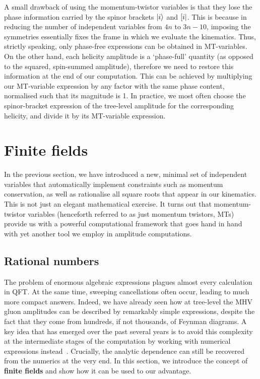 \documentclass[main.tex]{subfiles}
\begin{document}
A small drawback of using the momentum-twistor variables is that they lose the phase information carried by the spinor brackets $|i \rangle$ and $\left[ i \right|$. This is because in reducing the number of independent variables from $4n$ to $3n-10$, imposing the symmetries essentially fixes the frame in which we evaluate the kinematics. Thus, strictly speaking, only phase-free expressions can be obtained in MT-variables. On the other hand, each helicity amplitude is a `phase-full' quantity (as opposed to the squared, spin-summed amplitude), therefore we need to restore this information at the end of our computation. This can be achieved by multiplying our MT-variable expression by any factor with the same phase content, normalised such that its magnitude is 1. In practice, we most often choose the spinor-bracket expression of the tree-level amplitude for the corresponding helicity, and divide it by its MT-variable expression.
\section{Finite fields} \label{sec:FF}
In the previous section, we have introduced a new, minimal set of independent variables that automatically implement constraints such as momentum conservation, as well as rationalise all square roots that appear in our kinematics. This is not just an elegant mathematical exercise. It turns out that momentum-twistor variables (henceforth referred to as just momentum twistors, MTs) provide us with a powerful computational framework that goes hand in hand with yet another tool we employ in amplitude computations.
\subsection{Rational numbers} \label{sec:ratnums}
The problem of enormous algebraic expressions plagues almost every calculation in QFT. At the same time, sweeping cancellations often occur, leading to much more compact answers. Indeed, we have already seen how at tree-level the MHV gluon amplitudes can be described by remarkably simple expressions, despite the fact that they come from hundreds, if not thousands, of Feynman diagrams. A key idea that has emerged over the past several years is to avoid this complexity at the intermediate stages of the computation by working with numerical expressions instead~\cite{Peraro:2016wsq, Peraro:2019svx, Klappert:2019emp, Klappert:2020aqs, vonManteuffel:2014ixa, Abreu:2020xvt}. Crucially, the analytic dependence can still be recovered from the numerics at the very end. In this section, we introduce the concept of \textbf{finite fields} and show how it can be used to our advantage.
\end{document}
